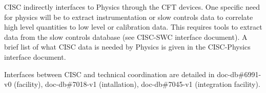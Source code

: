 CISC indirectly interfaces to Physics through the CFT devices. One specific need for physics will be to extract
instrumentation or slow controls data to correlate high level quantities to low level or calibration data.
This requires tools to extract data from the slow controls database (see CISC-SWC interface document).
A brief list of what CISC data is needed by Physics is given in the CISC-Physics interface document. 

Interfaces between CISC and technical coordination are detailed in doc-db\#6991-v0 (facility), doc-db\#7018-v1 (intallation), doc-db\#7045-v1 (integration facility). 


















